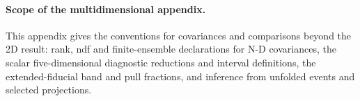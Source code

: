 \paragraph{Scope of the multidimensional appendix.} This appendix gives the conventions for covariances and comparisons beyond the 2D result: rank, ndf and finite-ensemble declarations for N-D covariances, the scalar five-dimensional diagnostic reductions and interval definitions, the extended-fiducial band and pull fractions, and inference from unfolded events and selected projections.

